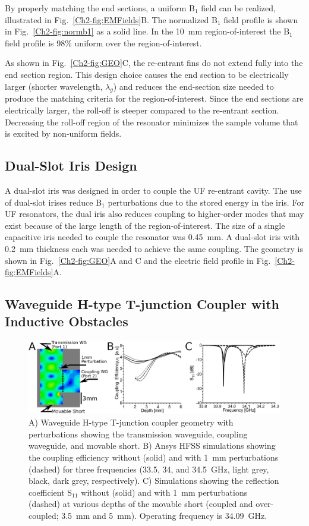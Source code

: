 By properly matching the end sections, a uniform B$_1$ field can be realized, illustrated in Fig.~\ref{Ch2-fig:EMFields}B. The normalized B$_1$ field profile is shown in Fig.~\ref{Ch2-fig:normb1} as a solid line. In the 10~mm region-of-interest the B$_1$ field profile is 98\% uniform over the region-of-interest. 

As shown in Fig.~\ref{Ch2-fig:GEO}C, the re-entrant fins do not extend fully into the end section region. This design choice causes the end section to be electrically larger (shorter wavelength, $\lambda_g$) and reduces the end-section size needed to produce the matching criteria for the region-of-interest. Since the end sections are electrically larger, the roll-off is steeper compared to the re-entrant section. Decreasing the roll-off region of the resonator minimizes the sample volume that is excited by non-uniform fields.

\subsection{Dual-Slot Iris Design}

A dual-slot iris was designed in order to couple the UF re-entrant \cylTE{} cavity. The use of dual-slot irises reduce B$_1$ perturbations due to the stored energy in the iris. For UF resonators, the dual iris also reduces coupling to higher-order modes that may exist because of the large length of the region-of-interest. \cite{UFLGR2017} The size of a single capacitive iris needed to couple the resonator was 0.45~mm. A dual-slot iris with 0.2~mm thickness each was needed to achieve the same coupling. The geometry is shown in Fig.~\ref{Ch2-fig:GEO}A and C and the electric field profile in Fig.~\ref{Ch2-fig:EMFields}A.

\subsection{Waveguide H-type T-junction Coupler with Inductive Obstacles}
\begin{figure}[htp]\centering
 \includegraphics[width=\textwidth]{Kapitel/Ch2-Images/04-CouplingPert.eps}
 \caption[Waveguide H-type T-junction coupler geometry.]{A) Waveguide H-type T-junction coupler geometry with perturbations showing the transmission waveguide, coupling waveguide, and movable short. B) Ansys HFSS simulations showing the coupling efficiency without (solid) and with 1~mm perturbations (dashed) for three frequencies (33.5, 34, and 34.5~GHz, light grey, black, dark grey, respectively). C) Simulations showing the reflection coefficient S$_{\text{11}}$ without (solid) and with 1~mm perturbations (dashed) at various depths of the movable short (coupled and over-coupled; 3.5~mm and 5~mm). Operating frequency is 34.09~GHz.}
 \label{Ch2-fig:waveguide}
\end{figure}

